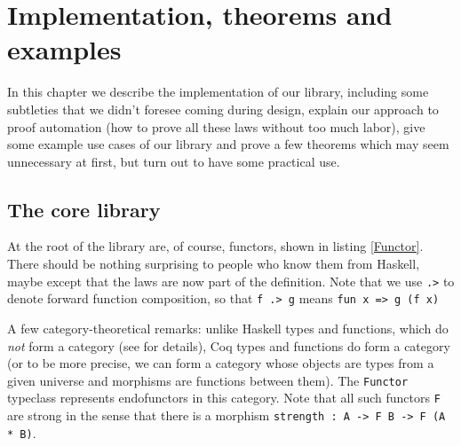 \documentclass[declaration,inz,english,shortabstract]{iithesis}
\newcommand{\m}[1]{\texttt{#1}}
\begin{document}
\chapter{Implementation, theorems and examples} \label{ch4}

In this chapter we describe the implementation of our library, including some subtleties that we didn't foresee coming during design, explain our approach to proof automation (how to prove all these laws without too much labor), give some example use cases of our library and prove a few theorems which may seem unnecessary at first, but turn out to have some practical use.

\section{The core library}


At the root of the library are, of course, functors, shown in listing \ref{Functor}. There should be nothing surprising to people who know them from Haskell, maybe except that the laws are now part of the definition. Note that we use \m{.>} to denote forward function composition, so that \m{f .> g} means \m{fun x => g (f x)}

A few category-theoretical remarks: unlike Haskell types and functions, which do \textit{not} form a category (see \cite{Hask} for details), Coq types and functions do form a category (or to be more precise, we can form a category whose objects are types from a given universe and morphisms are functions between them). The \m{Functor} typeclass represents endofunctors in this category. Note that all such functors \m{F} are strong in the sense that there is a morphism \m{strength : A -> F B -> F (A * B)}.

\end{document}
